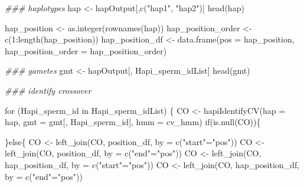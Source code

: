 \documentclass[
  letterpaper,
  DIV=11,
  numbers=noendperiod]{scrreprt}
\newenvironment{Shaded}{\begin{snugshade}}{\end{snugshade}}
\newcommand{\AttributeTok}[1]{\textcolor[rgb]{0.40,0.45,0.13}{#1}}
\newcommand{\ControlFlowTok}[1]{\textcolor[rgb]{0.00,0.23,0.31}{#1}}
\newcommand{\DecValTok}[1]{\textcolor[rgb]{0.68,0.00,0.00}{#1}}
\newcommand{\DocumentationTok}[1]{\textcolor[rgb]{0.37,0.37,0.37}{\textit{#1}}}
\newcommand{\FunctionTok}[1]{\textcolor[rgb]{0.28,0.35,0.67}{#1}}
\newcommand{\NormalTok}[1]{\textcolor[rgb]{0.00,0.23,0.31}{#1}}
\newcommand{\OtherTok}[1]{\textcolor[rgb]{0.00,0.23,0.31}{#1}}
\newcommand{\SpecialCharTok}[1]{\textcolor[rgb]{0.37,0.37,0.37}{#1}}
\newcommand{\StringTok}[1]{\textcolor[rgb]{0.13,0.47,0.30}{#1}}
\begin{document}
\begin{codelisting}
\begin{Shaded}
\begin{Highlighting}[]
        \DocumentationTok{\#\#\# haplotypes}
\NormalTok{        hap }\OtherTok{\textless{}{-}}\NormalTok{ hapOutput[,}\FunctionTok{c}\NormalTok{(}\StringTok{"hap1"}\NormalTok{, }\StringTok{"hap2"}\NormalTok{)]}
        \FunctionTok{head}\NormalTok{(hap)}
        
\NormalTok{        hap\_position }\OtherTok{\textless{}{-}} \FunctionTok{as.integer}\NormalTok{(}\FunctionTok{rownames}\NormalTok{(hap))}
\NormalTok{        hap\_position\_order }\OtherTok{\textless{}{-}} \FunctionTok{c}\NormalTok{(}\DecValTok{1}\SpecialCharTok{:}\FunctionTok{length}\NormalTok{(hap\_position))}
\NormalTok{        hap\_position\_df }\OtherTok{\textless{}{-}} \FunctionTok{data.frame}\NormalTok{(}\AttributeTok{pos =}\NormalTok{ hap\_position, }\AttributeTok{hap\_position\_order =}\NormalTok{ hap\_position\_order)}
        
        \DocumentationTok{\#\#\# gametes}
\NormalTok{        gmt }\OtherTok{\textless{}{-}}\NormalTok{ hapOutput[, Hapi\_sperm\_idList]}
        \FunctionTok{head}\NormalTok{(gmt)}

        \DocumentationTok{\#\#\# identify crossover}
        
        \ControlFlowTok{for}\NormalTok{ (Hapi\_sperm\_id }\ControlFlowTok{in}\NormalTok{ Hapi\_sperm\_idList) \{}
\NormalTok{          CO }\OtherTok{\textless{}{-}} \FunctionTok{hapiIdentifyCV}\NormalTok{(}\AttributeTok{hap =}\NormalTok{ hap, }\AttributeTok{gmt =}\NormalTok{ gmt[, Hapi\_sperm\_id], }\AttributeTok{hmm =}\NormalTok{ cv\_hmm)}
          \ControlFlowTok{if}\NormalTok{(}\FunctionTok{is.null}\NormalTok{(CO))\{}
            
\NormalTok{          \}}\ControlFlowTok{else}\NormalTok{\{}
\NormalTok{            CO }\OtherTok{\textless{}{-}} \FunctionTok{left\_join}\NormalTok{(CO, position\_df, }\AttributeTok{by =} \FunctionTok{c}\NormalTok{(}\StringTok{"start"}\OtherTok{=}\StringTok{"pos"}\NormalTok{))}
\NormalTok{            CO }\OtherTok{\textless{}{-}} \FunctionTok{left\_join}\NormalTok{(CO, position\_df, }\AttributeTok{by =} \FunctionTok{c}\NormalTok{(}\StringTok{"end"}\OtherTok{=}\StringTok{"pos"}\NormalTok{))}
\NormalTok{            CO }\OtherTok{\textless{}{-}} \FunctionTok{left\_join}\NormalTok{(CO, hap\_position\_df, }\AttributeTok{by =} \FunctionTok{c}\NormalTok{(}\StringTok{"start"}\OtherTok{=}\StringTok{"pos"}\NormalTok{))}
\NormalTok{            CO }\OtherTok{\textless{}{-}} \FunctionTok{left\_join}\NormalTok{(CO, hap\_position\_df, }\AttributeTok{by =} \FunctionTok{c}\NormalTok{(}\StringTok{"end"}\OtherTok{=}\StringTok{"pos"}\NormalTok{))}
            

\end{Highlighting}
\end{Shaded}
\end{codelisting}
\end{document}
